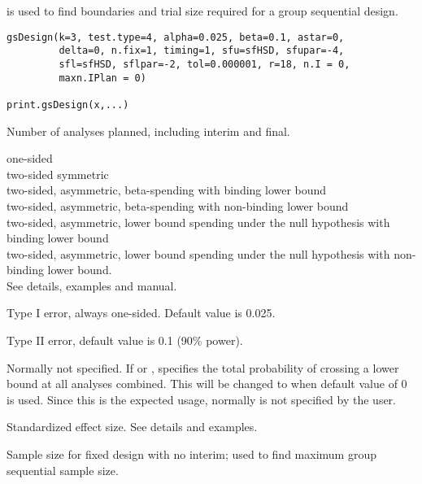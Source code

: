 \begin{Description}\relax
{} is used to find boundaries and trial size required for a group sequential design.
\end{Description}
\begin{Usage}
\begin{verbatim}
gsDesign(k=3, test.type=4, alpha=0.025, beta=0.1, astar=0,  
         delta=0, n.fix=1, timing=1, sfu=sfHSD, sfupar=-4,
         sfl=sfHSD, sflpar=-2, tol=0.000001, r=18, n.I = 0,
         maxn.IPlan = 0) 

print.gsDesign(x,...)\end{verbatim}
\end{Usage}
\begin{Arguments}
\begin{ldescription}
\item[\code{k}] Number of analyses planned, including interim and final.
\item[\code{test.type}] one-sided \\
two-sided symmetric \\
two-sided, asymmetric, beta-spending with binding lower bound \\
two-sided, asymmetric, beta-spending with non-binding lower bound \\
two-sided, asymmetric, lower bound spending under the null hypothesis with binding lower bound \\
two-sided, asymmetric, lower bound spending under the null hypothesis with non-binding lower bound. \\ See details, examples and manual.
\item[\code{alpha}] Type I error, always one-sided. Default value is 0.025.
\item[\code{beta}] Type II error, default value is 0.1 (90\% power).
\item[\code{astar}] Normally not specified. If  or ,  specifies the total
probability of crossing a lower bound at all analyses combined. 
This will be changed to  when default value of 0 is used. 
Since this is the expected usage, normally  is not specified by the user.
\item[\code{delta}] Standardized effect size. See details and examples.
\item[\code{n.fix}] Sample size for fixed design with no interim; used to find maximum group sequential sample size.

\end{ldescription}
\end{Arguments}
